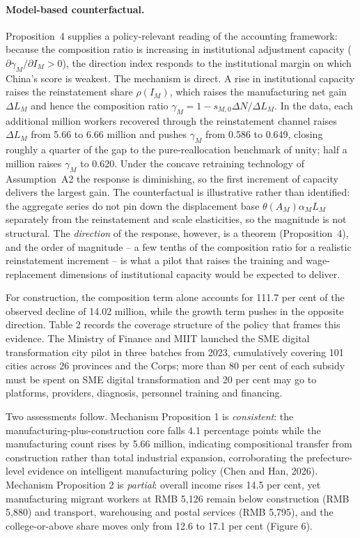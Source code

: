 \documentclass[12pt]{article}
\begin{document}
\paragraph{Model-based counterfactual.} Proposition~4 supplies a policy-relevant reading of the accounting framework: because the composition ratio is increasing in institutional adjustment capacity ($\partial\gamma_M/\partial I_M>0$), the direction index responds to the institutional margin on which China's score is weakest. The mechanism is direct. A rise in institutional capacity raises the reinstatement share $\rho(I_M)$, which raises the manufacturing net gain $\Delta L_M$ and hence the composition ratio $\gamma_M=1-s_{M,0}\Delta N/\Delta L_M$. In the data, each additional million workers recovered through the reinstatement channel raises $\Delta L_M$ from 5.66 to 6.66 million and pushes $\gamma_M$ from 0.586 to 0.649, closing roughly a quarter of the gap to the pure-reallocation benchmark of unity; half a million raises $\gamma_M$ to 0.620. Under the concave retraining technology of Assumption~A2 the response is diminishing, so the first increment of capacity delivers the largest gain. The counterfactual is illustrative rather than identified: the aggregate series do not pin down the displacement base $\theta(A_M)\alpha_M L_M$ separately from the reinstatement and scale elasticities, so the magnitude is not structural. The \emph{direction} of the response, however, is a theorem (Proposition~4), and the order of magnitude -- a few tenths of the composition ratio for a realistic reinstatement increment -- is what a pilot that raises the training and wage-replacement dimensions of institutional capacity would be expected to deliver.

For construction, the composition term alone accounts for 111.7 per cent of the observed decline of 14.02 million, while the growth term pushes in the opposite direction. Table 2 records the coverage structure of the policy that frames this evidence. The Ministry of Finance and MIIT launched the SME digital transformation city pilot in three batches from 2023, cumulatively covering 101 cities across 26 provinces and the Corps; more than 80 per cent of each subsidy must be spent on SME digital transformation and 20 per cent may go to platforms, providers, diagnosis, personnel training and financing.



Two assessments follow. Mechanism Proposition 1 is \emph{consistent}: the manufacturing-plus-construction core falls 4.1 percentage points while the manufacturing count rises by 5.66 million, indicating compositional transfer from construction rather than total industrial expansion, corroborating the prefecture-level evidence on intelligent manufacturing policy (Chen and Han, 2026). Mechanism Proposition 2 is \emph{partial}: overall income rises 14.5 per cent, yet manufacturing migrant workers at RMB 5,126 remain below construction (RMB 5,880) and transport, warehousing and postal services (RMB 5,795), and the college-or-above share moves only from 12.6 to 17.1 per cent (Figure 6).
\end{document}

